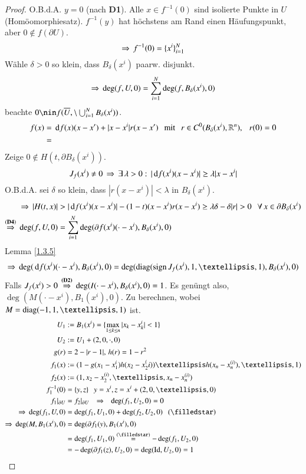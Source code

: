 \begin{proof}
    O.B.d.A. $y=0$ (nach \textbf{D1}). Alle $x\in f^{-1} (0)$ sind isolierte Punkte in $U$
    (Homöomorphiesatz).
    $f^{-1}(y)$ hat höchstens am Rand einen Häufungspunkt, aber $0\nin f(\partial U)$.
    \[
        \Rightarrow \, f^{-1}(0)= \{ x^i \}_{i=1}^N
    \]
    Wähle $\delta >0$ so klein, dass $B_\delta(x^i)$ paarw. disjunkt.
    \[
        \Rightarrow \, \deg(f,U,0)=\sum_{i=1}^N \deg(f,B_\delta(x^i),0)
    \]
    beachte $0\nin f(\ol U, \setminus \bigcup_{i=1}^N B_\delta(x^i))$.
    \begin{align*}
        f(x)&= \, \mathrm{d} f(x)(x-x') + |x-x^i| r(x-x') \hspace{.25cm} \text{mit} \hspace{.25cm} r\in C^0(B_\delta(x^i),\mathbb{R}^n), 
        \hspace{.25cm} r(0)=0\\
            &=
    \end{align*}
    Zeige $0\nin H(t,\partial B_\delta(x^i))$.
    \[
        J_f(x^i)\neq 0 \, \Rightarrow \, \exists\, \lambda >0:\, |\, \mathrm{d} f(x^i)(x-x^i)|\geq \lambda|x-x^i|
    \]
    O.B.d.A. sei $\delta$ so klein, dass $|r(x-x^i)|<\lambda$ in $B_\delta (x^i)$.
    \begin{align*}
        \Ra\, | H(t,x) |&>|\d f(x^i)(x-x^i)|-(1-t)(x-x^i)r(x-x^i)\geq \lambda \delta - \delta|r|>0
        \qq \forall \, x\in \partial B_\delta (x^i)\\
        \overset{(\textbf{D4})}{\Ra} \, \deg(f,U,0)&=\sum_{i=1}^N\deg (\partial f (x^i)(\cdot-x^i),
                B_\delta(x^i),0)
    \end{align*}
    Lemma \ref{1.3.5}
    \[
        \Ra \, \deg(\d f (x^i)(\cdot- x^i),B_\delta (x^i),0)= \deg(\diag(\sign J_f(x^i),1,…,1),
            B_\delta(x^i),0)
    \]
    Falls $J_f(x^i)>0\, \overset{\textbf{(D2)}}{\Rightarrow}\,\deg(I(\cdot-x^i),B_\delta (x^i),0)=1$. Es genüngt
    also, $\deg(M(\cdot-x^i),B_1(x^i),0)$. Zu berechnen, wobei $M=\diag(-1,1,…,1)$ ist.
    \begin{align*}
        U_1&:= B_1 (x^i) = \{ \max_{1\leq k\leq n} |x_k-x_k^i|<1 \}\\
        U_2&:= U_1+ (2,0,\cdot,0)\\
        g(r)&=2-|r-1|, \, h(r)=1-r^2\\
        f_1(x)&:= (1-g(x_1-x_1^i)h(x_2-x_2^(i))…h(x_n-x_n^{(i)}),…, 1)\\
        f_2(x)&:= (1,x_2-x_2^{(i)}, … , x_n-x_n^{(i)})\\
        f_1^{-1}(0)&= \{ y,z \} \qq y=x^i, z = x^i+(2,0,…,0)\\
        f_1|_{\partial U}&= f_2|_{\partial U} \qq \Ra \qq \deg(f_1,U_2,0)=0\\
        \Ra \, \deg (f_1,U,0)&= \deg(f_1,U_1,0)+ \deg(f_2,U_2,0) \qq (\star)\\
        \Ra \, \deg(M,B_1(x^i),0)&=\deg(\partial f_1(y),B_1(x^i), 0)\\
        &=\deg(f_1, U_1,0) \overset{(\star)}{=} -\deg (f_1,U_2,0)\\
        &= -\deg(\partial f_1(z),U_2,0)=\deg(\Id, U_2,0)=1
    \end{align*}
    \[ \]
\end{proof}
